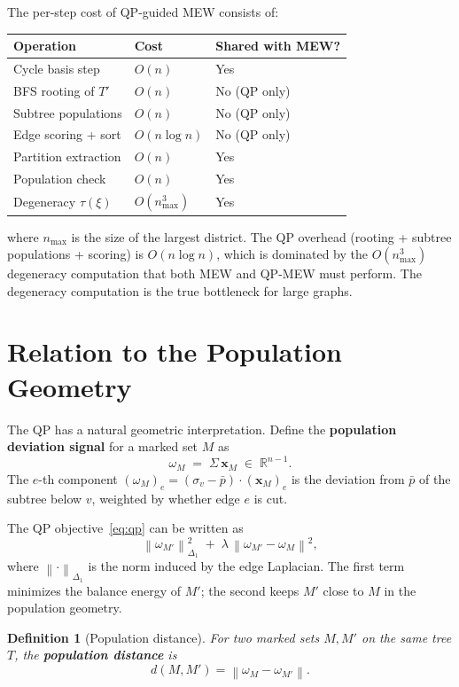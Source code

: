 \documentclass[11pt]{article}
\newtheorem{definition}{Definition}[section]
\newcommand{\R}{\mathbb{R}}
\newcommand{\norm}[1]{\left\lVert#1\right\rVert}
\newcommand{\pbar}{\bar{p}}
\begin{document}
The per-step cost of QP-guided MEW consists of:
\begin{center}
\renewcommand{\arraystretch}{1.3}
\begin{tabular}{lll}
\toprule
\textbf{Operation} & \textbf{Cost} & \textbf{Shared with MEW?} \\
\midrule
Cycle basis step & $O(n)$ & Yes \\
BFS rooting of $T'$ & $O(n)$ & No (QP only) \\
Subtree populations & $O(n)$ & No (QP only) \\
Edge scoring + sort & $O(n \log n)$ & No (QP only) \\
Partition extraction & $O(n)$ & Yes \\
Population check & $O(n)$ & Yes \\
Degeneracy $\tau(\xi)$ & $O(n_{\max}^3)$ & Yes \\
\bottomrule
\end{tabular}
\end{center}
where $n_{\max}$ is the size of the largest district. The QP overhead (rooting + subtree populations + scoring) is $O(n \log n)$, which is dominated by the $O(n_{\max}^3)$ degeneracy computation that both MEW and QP-MEW must perform. The degeneracy computation is the true bottleneck for large graphs.


\section{Relation to the Population Geometry}\label{sec:geometry}

The QP has a natural geometric interpretation. Define the \textbf{population deviation signal} for a marked set $M$ as
\[
\omega_M \;=\; \Sigma\, \mathbf{x}_M \;\in\; \R^{n-1}.
\]
The $e$-th component $(\omega_M)_e = (\sigma_v - \pbar) \cdot (\mathbf{x}_M)_e$ is the deviation from $\pbar$ of the subtree below $v$, weighted by whether edge $e$ is cut.

The QP objective~\eqref{eq:qp} can be written as
\[
\norm{\omega_{M'}}^2_{\Delta_1} \;+\; \lambda\, \norm{\omega_{M'} - \omega_M}^2,
\]
where $\norm{\cdot}_{\Delta_1}$ is the norm induced by the edge Laplacian. The first term minimizes the balance energy of $M'$; the second keeps $M'$ close to $M$ in the population geometry.

\begin{definition}[Population distance]\label{def:distance}
For two marked sets $M, M'$ on the same tree $T$, the \textbf{population distance} is
\[
d(M, M') = \norm{\omega_M - \omega_{M'}}.
\]
\end{definition}
\end{document}
